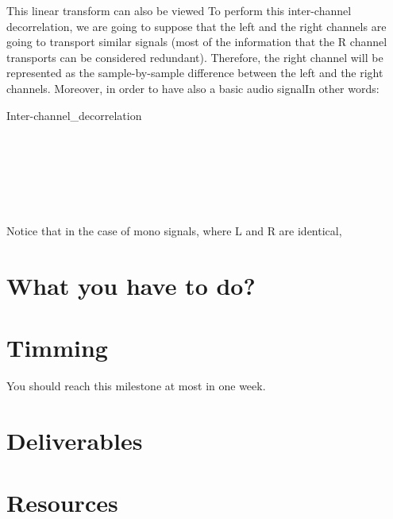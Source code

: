 This linear transform can also be viewed 
To perform this inter-channel decorrelation, we are going to suppose
that the left and the right channels are going to transport similar
signals (most of the information that the R channel transports can be
considered redundant). Therefore, the right channel will be
represented as the sample-by-sample difference between the left and
the right channels. Moreover, in order to have also a basic audio
signalIn other words:

\begin{pseudocode}{Inter-channel\_decorrelation}{~}
  \BEGIN
    
     \GETS {}\\
     \GETS {}\\
    \\
     \GETS {}\\
     \GETS {}\\
  \END
  \ENDPROCEDURE
\end{pseudocode}

Notice that in the case of mono signals, where L and R are identical, 


\section{What you have to do?}

\section{Timming}

You should reach this milestone at most in one week.

\section{Deliverables}

\section{Resources}


